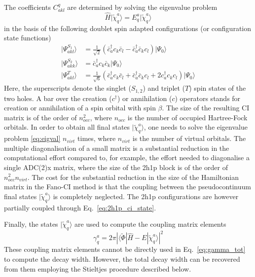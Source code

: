 \documentclass[a4paper, 10 pt]{report}
\newcommand{\ket}[1]{\ensuremath{| #1 \rangle}}
\newcommand{\dirint}[3]{\ensuremath{\langle #1|#2|#3\rangle}}
\begin{document}
The coefficients $C_{akl}^{q}$ are determined by solving the eigenvalue problem
%
\begin{equation}\label{eq:eigval}
\hat{H}\ket{\tilde{\chi}_{q}^{a}} = E_{q}^{a}\ket{\tilde{\chi}_{q}^{a}}
\end{equation}
%
in the basis of the following doublet spin adapted configurations (or 
configuration state functions)
%
\begin{align} %
\ket{\Psi_{akl}^{S_1}} & = \frac{1}{\sqrt{2}}(\bar{c}^{\dagger}_{a}c_{k}\bar{c}_{l} 
- \bar{c}^{\dagger}_{a}\bar{c}_{k}c_{l})\ket{\Psi_{0}} \label{eq:2h1p_s1} \\
\ket{\Psi_{akk}^{S_2}} & = \bar{c}^{\dagger}_{a}c_{k}\bar{c}_{k} \ket{\Psi_{0}}  \label{eq:2h1p_s2} \\
\ket{\Psi_{akl}^{T}} & = \frac{1}{\sqrt{6}} (\bar{c}^{\dagger}_{a} c_{k} \bar{c}_{l}
+ \bar{c}^{\dagger}_{a} \bar{c}_{k} c_{l}
+ 2 c^{\dagger}_{a} c_{k} c_{l} )\ket{\Psi_{0}} \label{eq:2h1p_t}
\end{align}
%
Here, the superscripts denote the singlet ($S_{1,2}$) and triplet ($T$) spin 
states of the two holes. A bar over the creation ($c^{\dagger}$) or annihilation 
($c$) operators stands for creation or annihilation of a spin orbital with spin 
$\beta$.  The size of the resulting CI matrix is of the order of 
$n_{occ}^2$, where $n_{occ}$ is the number of occupied Hartree-Fock orbitals. In 
order to obtain all final states \ket{\tilde{\chi}_{q}^{a}}, one needs to solve 
the eigenvalue problem \eqref{eq:eigval} $n_{virt}$ times, where $n_{virt}$ is 
the number of virtual orbitals. The multiple diagonalisation of a small matrix 
is a substantial reduction in the computational effort compared to, for example, 
the effort needed to diagonalise a single ADC(2)x matrix, where the size of the 
2h1p block is of the order of $n_{occ}^2n_{virt}$. The cost for the substantial 
reduction in the size of the Hamiltonian matrix in the Fano-CI method is that 
the coupling between the pseudocontinuum final states \ket{\tilde{\chi}_{q}^{a}} 
is completely neglected. The 2h1p configurations are however partially coupled 
through Eq.\ \eqref{eq:2h1p_ci_state}.


Finally, the states \ket{\tilde{\chi}_{q}^{a}} are used to compute the coupling 
matrix elements
%
\begin{equation}\label{eq:coupling_element}
\gamma^{a}_{q} = 2\pi|\dirint{\tilde{\Phi}}{\hat{H} - E}{\tilde{\chi}_{q}^{a}}|^2
\end{equation}
%
These coupling matrix elements cannot be directly used in 
Eq.\ \eqref{eq:gamma_tot} to compute the decay width. However, the total decay 
width can be recovered from them employing the Stieltjes procedure described 
below.
\end{document}
